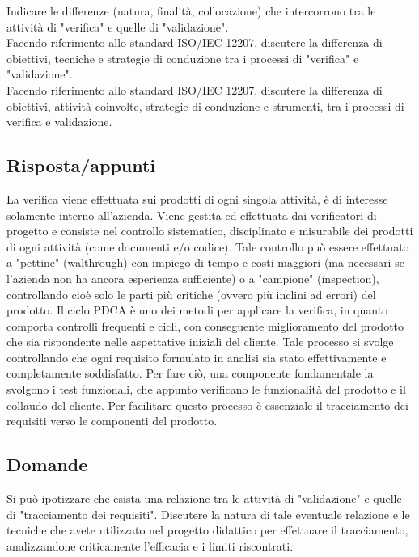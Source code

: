 Indicare le differenze (natura, finalità, collocazione) che intercorrono tra le attività di "verifica" e quelle di "validazione".\\

Facendo riferimento allo standard ISO/IEC 12207, discutere la differenza di obiettivi, tecniche e strategie di conduzione tra i processi di "verifica" e "validazione".\\

Facendo riferimento allo standard ISO/IEC 12207, discutere la differenza di obiettivi, attività coinvolte, strategie di conduzione e strumenti, tra i processi di verifica e validazione.

\subsection*{Risposta/appunti}
La verifica viene effettuata sui prodotti di ogni singola attività, è di interesse solamente interno all'azienda. Viene gestita
ed effettuata dai verificatori di progetto e consiste nel controllo sistematico, disciplinato e misurabile dei prodotti di
ogni attività (come documenti e/o codice). Tale controllo può essere effettuato a "pettine" (walthrough) con impiego di
tempo e costi maggiori (ma necessari se l'azienda non ha ancora esperienza sufficiente) o a "campione" (inspection),
controllando cioè solo le parti più critiche (ovvero più inclini ad errori) del prodotto.
Il ciclo PDCA è uno dei metodi per applicare la verifica, in quanto comporta controlli frequenti e cicli, con conseguente
miglioramento del prodotto che sia rispondente nelle aspettative iniziali del cliente. Tale processo si svolge controllando
che ogni requisito formulato in analisi sia stato effettivamente e completamente soddisfatto. Per fare ciò, una
componente fondamentale la svolgono i test funzionali, che appunto verificano le funzionalità del prodotto e il collaudo
del cliente. Per facilitare questo processo è essenziale il tracciamento dei requisiti verso le componenti del prodotto. 

\subsection*{Domande}
Si può ipotizzare che esista una relazione tra le attività di "validazione" e quelle di "tracciamento dei requisiti". Discutere la natura di tale eventuale relazione e le tecniche che avete utilizzato nel progetto didattico per effettuare il tracciamento, analizzandone criticamente l'efficacia e i limiti riscontrati.

